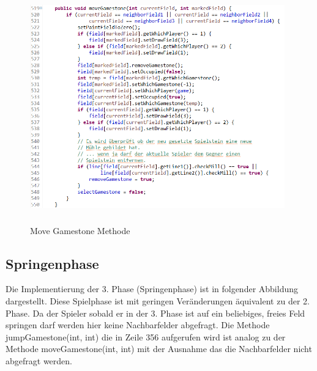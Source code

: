 \documentclass[oneside]{ausarbeitung}
\begin{document}
\begin{figure}[ht]
	\centering
	\includegraphics[width=11cm,height=10cm]{images/moveGamestoneMethode.png}
	\caption[Move Gamestone Methode]{Move Gamestone Methode}
\end{figure}

\clearpage

\subsection{Springenphase}

Die Implementierung der 3. Phase (Springenphase) ist in folgender Abbildung dargestellt. Diese Spielphase ist mit geringen Veränderungen äquivalent zu der 2. Phase. Da der Spieler sobald er in der 3. Phase ist auf ein beliebiges, freies Feld springen darf werden hier keine Nachbarfelder abgefragt. Die Methode jumpGamestone(int, int) die in Zeile 356 aufgerufen wird ist analog zu der Methode moveGamestone(int, int) mit der Ausnahme das die Nachbarfelder nicht abgefragt werden.
\end{document}
